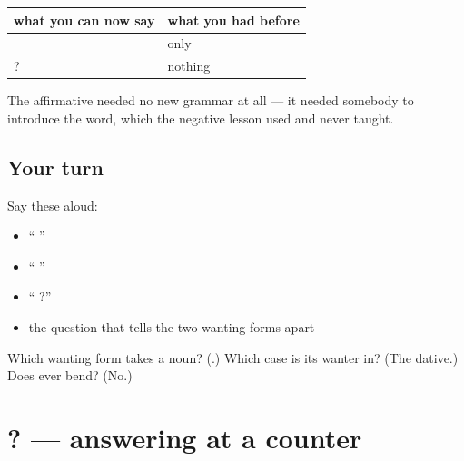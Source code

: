 \begin{grammarlens}[title={Grammar Lens: the verb that was only ever denied}]
\noindent
\begin{tabularx}{\linewidth}{@{}>{\raggedright\arraybackslash}X>{\raggedright\arraybackslash}X@{}}
\toprule
\textbf{what you can now say} & \textbf{what you had before} \\
\midrule
\hi{मैं} \hi{जानता} \hi{हूँ} & only \hi{मैं} \hi{नहीं} \hi{जानता} \\
\hi{क्या} \hi{आप} \hi{जानते} \hi{हैं}? & nothing \\
\bottomrule
\end{tabularx}

The affirmative needed no new grammar at all — it needed somebody to introduce the word, which the negative lesson used and never taught.
\end{grammarlens}

\subsection*{Your turn}
Say these aloud:

\begin{itemize}
\raggedright
  \item \textquotedblleft{}  \textquotedblright{}
  \item \textquotedblleft{}  \textquotedblright{}
  \item \textquotedblleft{}   ?\textquotedblright{}
  \item the question that tells the two wanting forms apart
\end{itemize}

\begin{tcolorbox}[breakable,colback=teal!4,colframe=teal!35!black,title={Before you move on}]
Which wanting form takes a noun? (\textbf{}.) Which case is its wanter in? (The dative.) Does \textbf{} ever bend? (No.)
\end{tcolorbox}
\section[\texorpdfstring{\hi{आपको} \hi{क्या} \hi{चाहिए}? (āpko kyā cāhiye?)}{आपको क्या चाहिए? (āpko kyā cāhiye?)}]{  ? — answering at a counter}

\label{lesson:HI-C95-sintesis-chaay}



